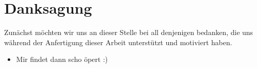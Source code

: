\newpage
{}
\chapter*{Danksagung}
Zunächst möchten wir uns an dieser Stelle bei all denjenigen bedanken, die uns während der Anfertigung dieser Arbeit unterstützt und motiviert haben.
\begin{itemize}
	\item{Mir findet dann scho öpert :)}
\end{itemize}